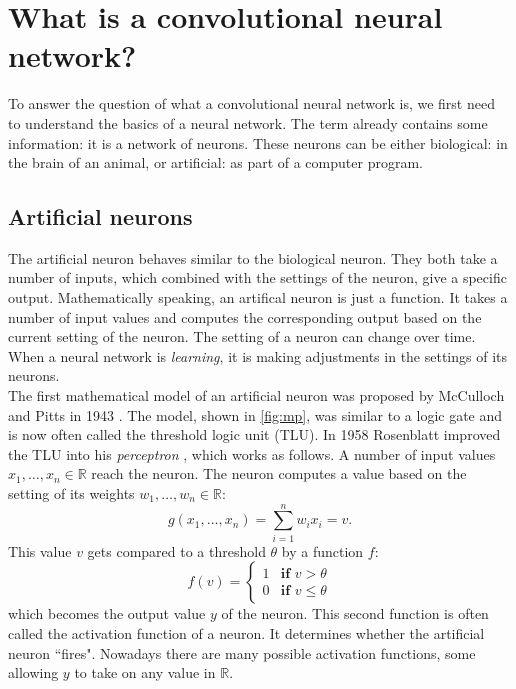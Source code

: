\section{What is a convolutional neural network?}

To answer the question of what a convolutional neural network is, we first need to understand the basics of a neural network. The term already contains some information: it is a network of neurons. These neurons can be either biological: in the brain of an animal, or artificial: as part of a computer program.\\

\subsection{Artificial neurons}

The artificial neuron behaves similar to the biological neuron. They both take a number of inputs, which combined with the settings of the neuron, give a specific output. Mathematically speaking, an artifical neuron is just a function. It takes a number of input values and computes the corresponding output based on the current setting of the neuron. The setting of a neuron can change over time. When a neural network is \textit{learning}, it is making adjustments in the settings of its neurons.\\

The first mathematical model of an artificial neuron was proposed by McCulloch and Pitts in 1943 \cite{first, mcc}. The model, shown in \autoref{fig:mp}, was similar to a logic gate and is now often called the threshold logic unit (TLU). In 1958 Rosenblatt improved the TLU into his \textit{perceptron} \cite{percep}, which works as follows. A number of input values $x_1, \ldots, x_n \in \mathbb{R}$ reach the neuron. The neuron computes a value based on the setting of its weights $w_1, \ldots, w_n \in \mathbb{R}$:
\begin{equation*}
    g(x_1, \ldots, x_n) = \sum_{i=1}^n w_i x_i = v.
\end{equation*}
This value $v$ gets compared to a threshold $\theta$ by a function $f$:
\begin{equation*}
    f(v) = 
    \begin{cases}
        1 & \textbf{if } v > \theta \\
        0 & \textbf{if } v \leq \theta
    \end{cases}
\end{equation*}
which becomes the output value $y$ of the neuron. This second function is often called the activation function of a neuron. It determines whether the artificial neuron ``fires". Nowadays there are many possible activation functions, some allowing $y$ to take on any value in $\mathbb{R}$.\\

